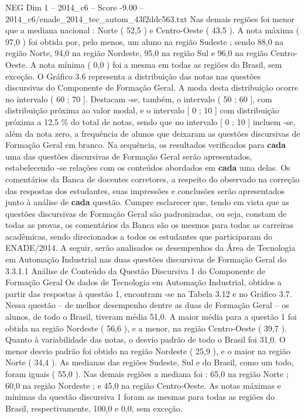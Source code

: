 \begin{textsample}{NEG Dim 1 – 2014\_c6 – Score -9.00 – 2014\_c6/enade\_2014\_tec\_autom\_43f2ddc563.txt}
Nas demais regiões foi menor que a mediana nacional : Norte ( 52,5 ) e Centro-Oeste ( 43,5 ).
A nota máxima ( 97,0 ) foi obtida por, pelo menos, um aluno na região Sudeste ; sendo 88,0 na região Norte, 94,0 na região Nordeste, 95,0 na região Sul e 96,0 na região Centro-Oeste.
A nota mínima ( 0,0 ) foi a mesma em todas as regiões do Brasil, sem exceção.
O Gráfico 3.6 representa a distribuição das notas nas questões discursivas do Componente de Formação Geral.
A moda desta distribuição ocorre no intervalo ( 60 ; 70 ].
Destacam -se, também, o intervalo ( 50 ; 60 ], com distribuição próxima ao valor modal, e o intervalo [ 0 ; 10 ] com distribuição próxima a 12,5 \% do total de notas, sendo que no intervalo [ 0 ; 10 ] incluem -se, além da nota zero, a frequência de alunos que deixaram as questões discursivas de Formação Geral em branco.
Na sequência, os resultados verificados para \textbf{cada} uma das questões discursivas de Formação Geral serão apresentados, estabelecendo -se relações com os conteúdos abordados em \textbf{cada} uma delas.
Os comentários da Banca de docentes corretores, a respeito do observado na correção das respostas dos estudantes, suas impressões e conclusões serão apresentados junto à análise de \textbf{cada} questão.
Cumpre esclarecer que, tendo em vista que as questões discursivas de Formação Geral são padronizadas, ou seja, constam de todas as provas, os comentários da Banca são os mesmos para todas as carreiras acadêmicas, sendo direcionados a todos os estudantes que participaram do ENADE/2014.
A seguir, serão analisados os desempenhos da Área de Tecnologia em Automação Industrial nas duas questões discursivas de Formação Geral do 3.3.1.1 Análise de Conteúdo da Questão Discursiva 1 do Componente de Formação Geral Os dados de Tecnologia em Automação Industrial, obtidos a partir das respostas à questão 1, encontram -se na Tabela 3.12 e no Gráfico 3.7.
Nessa questão – de melhor desempenho dentre as duas de Formação Geral – os alunos, de todo o Brasil, tiveram média 51,0.
A maior média para a questão 1 foi obtida na região Nordeste ( 56,6 ), e a menor, na região Centro-Oeste ( 39,7 ).
Quanto à variabilidade das notas, o desvio padrão de todo o Brasil foi 31,0.
O menor desvio padrão foi obtido na região Nordeste ( 25,9 ), e o maior na região Norte ( 34,4 ).
As medianas das regiões Sudeste, Sul e do Brasil, como um todo, foram iguais ( 55,0 ).
Nas demais regiões a mediana foi : 65,0 na região Norte ; 60,0 na região Nordeste ; e 45,0 na região Centro-Oeste.
As notas máximas e mínimas da questão discursiva 1 foram as mesmas para todas as regiões do Brasil, respectivamente, 100,0 e 0,0, sem exceção.

\end{textsample}
